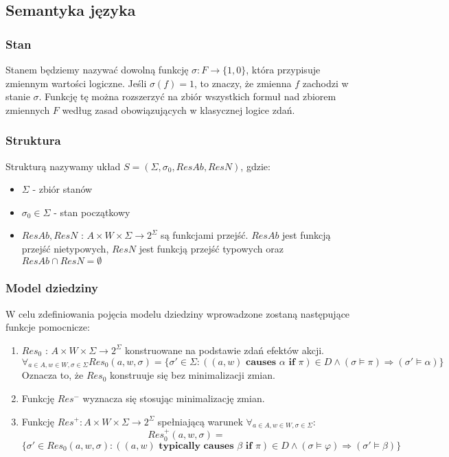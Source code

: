 \documentclass{article}
\begin{document}
\subsection{Semantyka języka} 

\subsubsection{Stan}
Stanem będziemy nazywać dowolną funkcję $\sigma:F\to \{1,0\}$, która przypisuje zmiennym wartości logiczne. Jeśli $\sigma(f)=1$, to znaczy, że zmienna $f$ zachodzi w stanie $\sigma$. Funkcję tę można rozszerzyć na zbiór wszystkich formuł nad zbiorem zmiennych $F$ według zasad obowiązujących w klasycznej logice zdań.

\subsubsection{Struktura}
Strukturą nazywamy układ $S=(\Sigma, \sigma_{0}, ResAb, ResN)$, gdzie:
\begin{itemize}
\item $\Sigma$ - zbiór stanów
\item $\sigma_{0} \in \Sigma$ - stan początkowy
\item $ResAb, ResN$ : $A\times W \times \Sigma \to 2^{\Sigma}$ są funkcjami przejść. $ResAb$ jest funkcją przejść nietypowych, $ResN$ jest funkcją przejść typowych oraz $ResAb \cap ResN= \emptyset$ 
\end{itemize}

\subsubsection{Model dziedziny}
W celu zdefiniowania pojęcia modelu dziedziny wprowadzone zostaną następujące funkcje pomocnicze:
\begin{enumerate}
	\item $Res_{0}$ : $A \times W \times \Sigma \to 2^{\Sigma}$ konstruowane na podstawie zdań efektów akcji.
	\[ \forall_{a \in A, w \in W, \sigma \in \Sigma} Res_{0}(a,w,\sigma) = \{\sigma' \in \Sigma: ((a, w) \textbf{ causes } \alpha \textbf{ if } \pi) \in D \land (\sigma \models \pi) \Rightarrow (\sigma' \models \alpha) \}  \]
	Oznacza to, że $Res_{0}$ konstruuje się bez minimalizacji zmian.
	\item Funkcję $Res^{-}$ wyznacza się stosując minimalizację zmian.
	\item Funkcję $Res^{+} : A \times W \times \Sigma \to 2^{\Sigma}$ spełniającą warunek $\forall_{a \in A, w \in W, \sigma \in \Sigma}$:
	\[ Res_{0}^{+}(a, w,\sigma) = \]
	\[ \{\sigma' \in Res_{0}(a, w,\sigma) : ((a, w) \textbf{ typically causes } \beta \textbf{ if } \pi) \in D \land (\sigma \models \varphi) \Rightarrow (\sigma' \models \beta) \}  \]
\end{enumerate}
\end{document}
